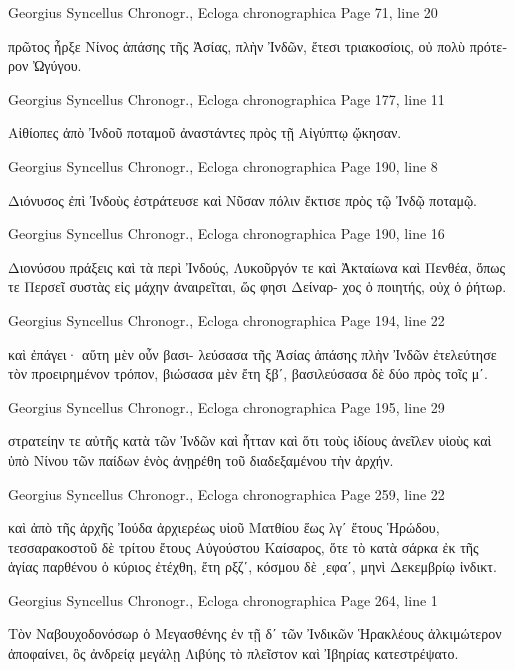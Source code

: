 \documentclass[12pt,letterpaper,twoside,final]{memoir}
\begin{document}
\begin{greek}
Georgius Syncellus Chronogr., Ecloga chronographica 
Page 71, line 20

                                                  πρῶτος ἦρξε Νίνος ἁπάσης 
τῆς Ἀσίας, πλὴν Ἰνδῶν, ἔτεσι τριακοσίοις, οὐ πολὺ πρότερον Ὠγύγου. 



Georgius Syncellus Chronogr., Ecloga chronographica 
Page 177, line 11

                                                                         Αἰθίοπες ἀπὸ 
Ἰνδοῦ ποταμοῦ ἀναστάντες πρὸς τῇ Αἰγύπτῳ ᾤκησαν. 



Georgius Syncellus Chronogr., Ecloga chronographica 
Page 190, line 8

Διόνυσος ἐπὶ Ἰνδοὺς ἐστράτευσε καὶ Νῦσαν πόλιν ἔκτισε πρὸς τῷ Ἰνδῷ 
ποταμῷ. 



Georgius Syncellus Chronogr., Ecloga chronographica 
Page 190, line 16

Διονύσου πράξεις καὶ τὰ περὶ Ἰνδούς, Λυκοῦργόν τε καὶ Ἀκταίωνα καὶ 
Πενθέα, ὅπως τε Περσεῖ συστὰς εἰς μάχην ἀναιρεῖται, ὥς φησι Δείναρ-
χος ὁ ποιητής, οὐχ ὁ ῥήτωρ. 



Georgius Syncellus Chronogr., Ecloga chronographica 
Page 194, line 22

                                               καὶ ἐπάγει· αὕτη μὲν οὖν βασι-
λεύσασα τῆς Ἀσίας ἁπάσης πλὴν Ἰνδῶν ἐτελεύτησε τὸν προειρημένον 
τρόπον, βιώσασα μὲν ἔτη ξβʹ, βασιλεύσασα δὲ δύο πρὸς τοῖς μʹ. 



Georgius Syncellus Chronogr., Ecloga chronographica 
Page 195, line 29

       στρατείην τε αὐτῆς κατὰ τῶν Ἰνδῶν καὶ ἧτταν καὶ ὅτι τοὺς ἰδίους 
ἀνεῖλεν υἱοὺς καὶ ὑπὸ Νίνου τῶν παίδων ἑνὸς ἀνῃρέθη τοῦ διαδεξαμένου 
τὴν ἀρχήν. 



Georgius Syncellus Chronogr., Ecloga chronographica 
Page 259, line 22

καὶ ἀπὸ τῆς ἀρχῆς Ἰούδα ἀρχιερέως υἱοῦ Ματθίου ἕως λγʹ ἔτους Ἡρώδου, 
τεσσαρακοστοῦ δὲ τρίτου ἔτους Αὐγούστου Καίσαρος, ὅτε τὸ κατὰ σάρκα 
ἐκ τῆς ἁγίας παρθένου ὁ κύριος ἐτέχθη, ἔτη ρξζʹ, κόσμου δὲ ͵εφαʹ, μηνὶ 
Δεκεμβρίῳ ἰνδικτ. 



Georgius Syncellus Chronogr., Ecloga chronographica 
Page 264, line 1

Τὸν Ναβουχοδονόσωρ ὁ Μεγασθένης ἐν τῇ δʹ τῶν Ἰνδικῶν Ἡρακλέους 
ἀλκιμώτερον ἀποφαίνει, ὃς ἀνδρείᾳ μεγάλῃ Λιβύης τὸ πλεῖστον καὶ 
Ἰβηρίας κατεστρέψατο. 




\end{greek}
\end{document}
